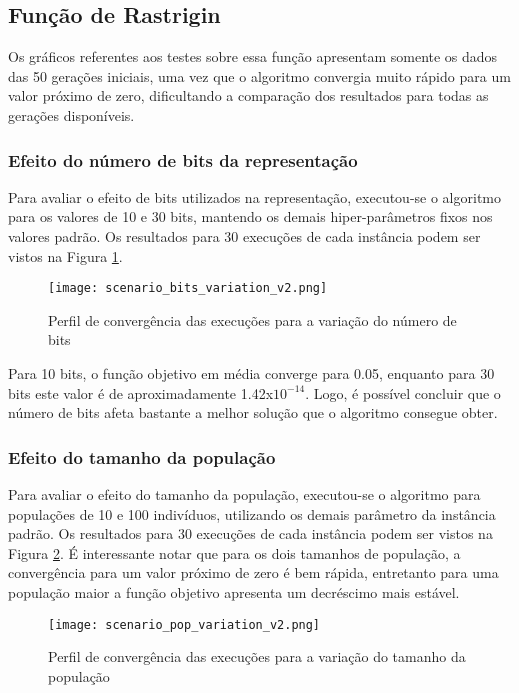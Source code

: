 \documentclass[conference]{IEEEtran}
\begin{document}
\subsection{Função de Rastrigin}

Os gráficos referentes aos testes sobre essa função apresentam somente os dados das 50 gerações iniciais, uma vez que o algoritmo convergia muito rápido para um valor próximo de zero, dificultando a comparação dos resultados para todas as gerações disponíveis.

\subsubsection{Efeito do número de bits da representação}
Para avaliar o efeito de bits utilizados na representação, executou-se o algoritmo para os valores de 10 e 30 bits, mantendo os demais hiper-parâmetros fixos nos valores padrão. Os resultados para 30 execuções de cada instância podem ser vistos na Figura \ref{fig:scenario_bits_variation}. 

\begin{figure}[h!]
	\centering
	\texttt{[image: scenario\_bits\_variation\_v2.png]}
	\caption{Perfil de convergência das execuções para a variação do número de bits}
	\label{fig:scenario_bits_variation}
\end{figure}

Para 10 bits, o função objetivo em média converge para 0.05, enquanto para 30 bits este valor é de aproximadamente 1.42x$10^{-14}$. Logo, é possível concluir que o número de bits afeta bastante a melhor solução que o algoritmo consegue obter.

\subsubsection{Efeito do tamanho da população}

Para avaliar o efeito do tamanho da população, executou-se o algoritmo para populações de 10 e 100 indivíduos, utilizando os demais parâmetro da instância padrão. Os resultados para 30 execuções de cada instância podem ser vistos na Figura \ref{fig:scenario_pop_variation}. É interessante notar que para os dois tamanhos de população, a convergência para um valor próximo de zero é bem rápida, entretanto para uma população maior a função objetivo apresenta um decréscimo mais estável.

\begin{figure}[h!]
	\centering
	\texttt{[image: scenario\_pop\_variation\_v2.png]}
	\caption{Perfil de convergência das execuções para a variação do tamanho da população}
	\label{fig:scenario_pop_variation}
\end{figure}
\end{document}
